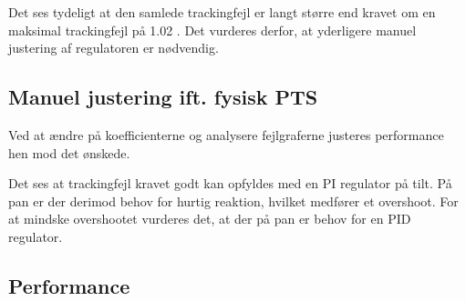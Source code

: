 Det ses tydeligt at den samlede trackingfejl er langt større end kravet om en 
maksimal trackingfejl på 1.02 \degree.
Det vurderes derfor, at yderligere manuel justering af regulatoren er nødvendig.

\subsection{Manuel justering ift. fysisk PTS}

Ved at ændre på koefficienterne og analysere fejlgraferne justeres performance 
hen mod det ønskede.

Det ses at trackingfejl kravet godt kan opfyldes med en PI regulator på tilt.
På pan er der derimod behov for hurtig reaktion, hvilket medfører et overshoot. 
For at mindske overshootet vurderes det, at der på pan er behov for en PID 
regulator.













\subsection{Performance}

